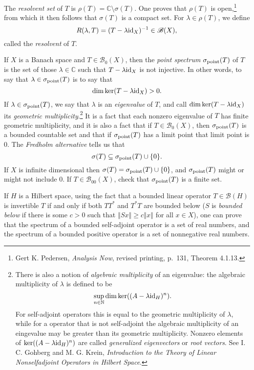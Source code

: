 \documentclass{article}
\newcommand{\id}{\ensuremath\mathrm{id}}
\newcommand{\point}{\ensuremath\sigma_{\mathrm{point}}}
\newcommand{\norm}[1]{\left\Vert #1 \right\Vert}
\theoremstyle{definition}
\begin{document}
The {\em resolvent set} of $T$ is $\rho(T) = \mathbb{C} \setminus \sigma(T)$. One proves that
$\rho(T)$ is open,\footnote{Gert K. Pedersen, {\em Analysis Now}, revised printing, p.~131, Theorem 4.1.13.} from which it then follows that $\sigma(T)$ is a compact set.
For $\lambda \in \rho(T)$, we define
\[
R(\lambda,T) = (T-\lambda \id_X)^{-1} \in \mathscr{B}(X),
\]
called the {\em resolvent} of $T$.


If $X$ is a Banach space and  $T \in \mathscr{B}_0(X)$, then
the {\em point spectrum} $\point(T)$ of $T$ is the set of those $\lambda \in \mathbb{C}$ such that $T-\lambda \id_X$ is not injective. In other words, to say that 
$\lambda \in \point(T)$ is to say that 
\[
\dim \ker(T-\lambda \id_X) >0.
\]
If $\lambda \in \point(T)$, we say that $\lambda$ is an {\em eigenvalue} of $T$, and call $\dim \ker(T-\lambda \id_X)$ its {\em geometric multiplicity}.\footnote{There is
also a notion of {\em algebraic multiplicity} of an eigenvalue: the algebraic multiplicity of $\lambda$ is defined to be
\[
\sup_{n \in \mathbb{N}} \dim \ker((A-\lambda \id_H)^n).
\]
For self-adjoint operators this is equal to the geometric multiplicity of $\lambda$, while for a operator that is not
self-adjoint the algebraic multiplicity of an eingevalue may be greater than its geometric multiplicity.
Nonzero elements of $\ker((A-\lambda \id_H)^n)$ are called {\em generalized eigenvectors} or {\em root vectors}.
See
I. C. Gohberg and M. G. Krein, {\em Introduction to the Theory
of Linear Nonselfadjoint Operators in Hilbert Space}.}
It is a fact that each nonzero eigenvalue of $T$ has finite geometric multiplicity, and  it is also a fact that if $T \in \mathscr{B}_0(X)$,
then $\point(T)$ is a bounded countable set and that if $\point(T)$ has a limit point that limit point is $0$.
The {\em Fredholm alternative} tells us that
\[
\sigma(T) \subseteq \point(T) \cup \{0\}.
\]
If $X$ is infinite dimensional then $\sigma(T) = \point(T) \cup \{0\}$, and $\point(T)$ might or might not include $0$.
If $T \in \mathscr{B}_{00}(X)$, check that $\point(T)$ is a finite set. 


If $H$ is a Hilbert space, 
using the fact that a bounded linear
operator $T \in \mathscr{B}(H)$ is invertible $T$ if and only if both $TT^*$ and $T^*T$ are  bounded below ($S$ is {\em bounded below} if there is some $c>0$ such that
$\norm{Sx} \geq c\norm{x}$ for all $x \in X$), one can prove that the spectrum of a bounded self-adjoint operator is a set
of real numbers, and the spectrum
of a bounded positive operator is a set of nonnegative real numbers.
\end{document}
